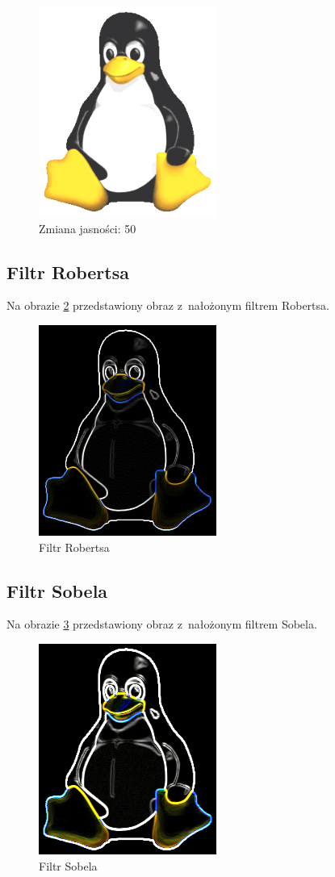 \documentclass[a4paper, 12pt]{article}
\begin{document}
\begin{figure}[p]
\includegraphics{b50}
\caption{Zmiana jasności: 50}
\label{fig:b50}
\end{figure}
\subsection{Filtr Robertsa}
Na obrazie \ref{fig:rob} przedstawiony obraz z~nałożonym filtrem Robertsa.
\begin{figure}[p]
\includegraphics{roberts}
\caption{Filtr Robertsa}
\label{fig:rob}
\end{figure}
\subsection{Filtr Sobela}
Na obrazie \ref{fig:sob} przedstawiony obraz z~nałożonym filtrem Sobela.
\begin{figure}[p]
\includegraphics{sobel}
\caption{Filtr Sobela}
\label{fig:sob}
\end{figure}
\end{document}
